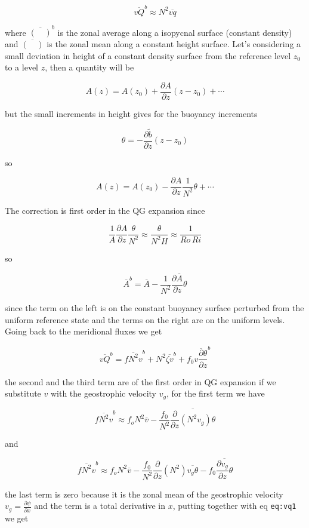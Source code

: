 {\[\overline{v Q}^b \approx N^2 \overline{v q}\]}

where \(\overline{( \quad  )}^b\) is the zonal average along a isopycnal
surface (constant density) and \(\overline{( \quad )}\) is the zonal
mean along a constant height surface. Let's considering a small
deviation in height of a constant density surface from the reference
level \(z_0\) to a level \(z\), then a quantity will be

\[A(z) = A(z_0) + \frac{\partial A}{\partial z}(z-z_0) + \cdots\]

but the small increments in height gives for the buoyancy increments

\[\theta = -\frac{\partial \tilde{b}}{\partial z}(z-z_0)\]

so

\[A(z) = A(z_0) - \frac{\partial A}{\partial z}\frac{1}{N^2}\theta + \cdots\]

The correction is first order in the QG expansion since

\[\frac{1}{A}\frac{\partial A}{\partial z}\frac{\theta}{N^2} \approx \frac{\theta}{N^2 H} \approx \frac{1}{Ro\,Ri}\]

so

\[\overline{A}^b = \overline{A} - \frac{1}{N^2}\overline{\frac{\partial A}{\partial z}\theta}\]

since the term on the left is on the constant buoyancy surface perturbed
from the uniform reference state and the terms on the right are on the
uniform levels. Going back to the meridional fluxes we get

{\[\overline{v Q}^b  = \overline{ f N^2 v}^b + N^2 \overline{\zeta v}^b + f_0 \overline{v\frac{\partial \theta}{\partial z}}^b\]}

the second and the third term are of the first order in QG expansion if
we substitute \(v\) with the geostrophic velocity \(v_g\), for the first
term we have

\[\overline{ f N^2 v}^b  \approx f_o N^2 \overline{v} - \frac{f_0}{N^2} \overline{\frac{\partial }{\partial z}\left(N^2 v_g\right)\theta}\]

and

\[\overline{ f N^2 v}^b  \approx f_o N^2 \overline{v} - \frac{f_0}{N^2} \frac{\partial }{\partial z}\left(N^2 \right)\overline{v_g\theta} - f_0 \overline{\frac{\partial v_g}{\partial z}\theta}\]

the last term is zero because it is the zonal mean of the geostrophic
velocity \(v_g=\frac{\partial \psi}{\partial x}\) and the term is a
total derivative in \(x\), putting together with eq \texttt{eq:vq1} we
get

